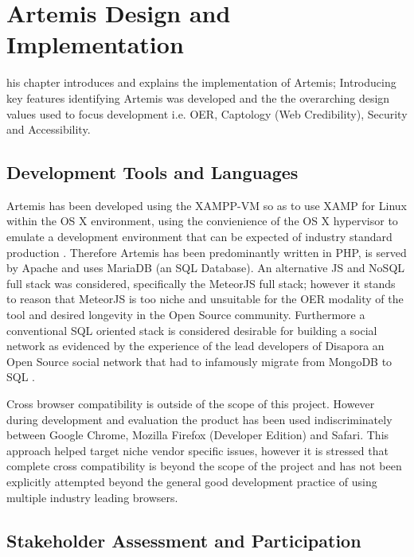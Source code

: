%
%
\let\textcircled=\pgftextcircled
\chapter{Artemis Design and Implementation}
\label{Artemis Design and Implementation}

his chapter introduces and explains the implementation of Artemis; Introducing key features identifying  Artemis was developed and the the overarching design values used to focus development i.e. OER, Captology (Web Credibility), Security and Accessibility.


\section{Development Tools and Languages}

Artemis has been developed using the XAMPP-VM so as to use XAMP for Linux within the OS X environment, using the convienience of the OS X hypervisor to emulate a development environment that can be expected of industry standard production \cite{ApacheFriends.org}. Therefore Artemis has been predominantly written in PHP, is served by Apache and uses MariaDB (an SQL Database). An alternative  JS and NoSQL full stack was considered, specifically the MeteorJS full stack; however it stands to reason that MeteorJS is too niche and unsuitable for the OER modality of the tool and desired longevity in the Open Source community. Furthermore a conventional SQL oriented stack is considered desirable for building a social network as evidenced by the experience of the lead developers of Disapora an Open Source social network that had to infamously migrate from MongoDB to SQL \cite{Mei}.

Cross browser compatibility is outside of the scope of this project. However during development and evaluation the product has been used indiscriminately between Google Chrome, Mozilla Firefox (Developer Edition) and Safari. This approach helped target niche vendor specific issues, however it is stressed that complete cross compatibility is beyond the scope of the project and has not been explicitly attempted beyond the general good development practice of using multiple industry leading browsers.







\section{Stakeholder Assessment and Participation}

